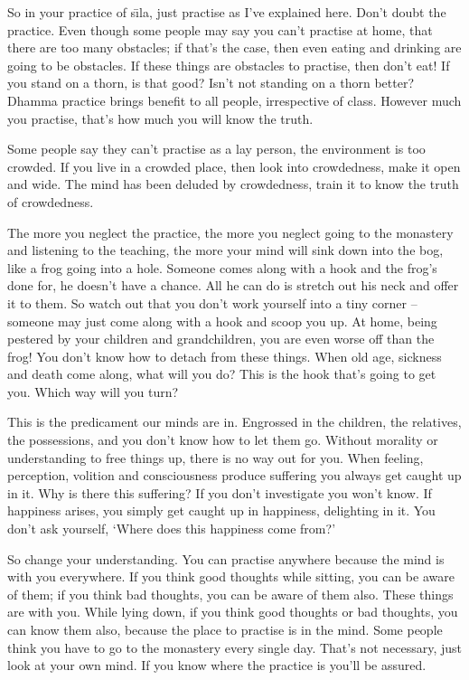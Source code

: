 So in your practice of s\={\i}la, just practise as I've explained here. Don't doubt the practice. Even though some people may say you can't practise at home, that there are too many obstacles; if that's the case, then even eating and drinking are going to be obstacles. If these things are obstacles to practise, then don't eat! If you stand on a thorn, is that good? Isn't not standing on a thorn better? Dhamma practice brings benefit to all people, irrespective of class. However much you practise, that's how much you will know the truth. 

Some people say they can't practise as a lay person, the environment is too crowded. If you live in a crowded place, then look into crowdedness, make it open and wide. The mind has been deluded by crowdedness, train it to know the truth of crowdedness.

The more you neglect the practice, the more you neglect going to the monastery and listening to the teaching, the more your mind will sink down into the bog, like a frog going into a hole. Someone comes along with a hook and the frog's done for, he doesn't have a chance. All he can do is stretch out his neck and offer it to them. So watch out that you don't work yourself into a tiny corner -- someone may just come along with a hook and scoop you up. At home, being pestered by your children and grandchildren, you are even worse off than the frog! You don't know how to detach from these things. When old age, sickness and death come along, what will you do? This is the hook that's going to get you. Which way will you turn? 

This is the predicament our minds are in. Engrossed in the children, the relatives, the possessions, and you don't know how to let them go. Without morality or understanding to free things up, there is no way out for you. When feeling, perception, volition and consciousness produce suffering you always get caught up in it. Why is there this suffering? If you don't investigate you won't know. If happiness arises, you simply get caught up in happiness, delighting in it. You don't ask yourself, `Where does this happiness come from?' 

So change your understanding. You can practise anywhere because the mind is with you everywhere. If you think good thoughts while sitting, you can be aware of them; if you think bad thoughts, you can be aware of them also. These things are with you. While lying down, if you think good thoughts or bad thoughts, you can know them also, because the place to practise is in the mind. Some people think you have to go to the monastery every single day. That's not necessary, just look at your own mind. If you know where the practice is you'll be assured. 

